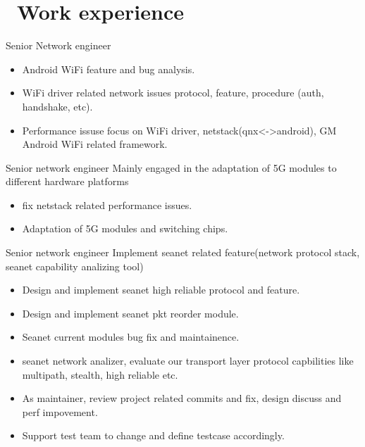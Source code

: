 \documentclass{resume}
\begin{document}



\section{\faUsers\ Work experience}
 {Senior Network engineer}
\begin{itemize}
\item Android WiFi feature and bug analysis.
\item WiFi driver related network issues protocol, feature, procedure (auth, handshake, etc).
\item Performance issuse focus on WiFi driver, netstack(qnx<->android), GM Android WiFi related framework.
\end{itemize}

 {Senior network engineer}
Mainly engaged in the adaptation of 5G modules to different hardware platforms
\begin{itemize}
\item fix netstack related performance issues.
\item Adaptation of 5G modules and switching chips.
\end{itemize}

 {Senior network engineer}
Implement seanet related feature(network protocol stack,  seanet capability analizing tool)
\begin{itemize}
\item Design and implement seanet high reliable protocol and feature.
\item Design and implement seanet pkt reorder module.
\item Seanet current modules bug fix and maintainence.
\item seanet network analizer, evaluate our transport layer protocol capbilities like multipath, stealth, high reliable etc.
\item As maintainer, review project related commits and fix, design discuss and perf impovement.
\item Support test team to change and define testcase accordingly.
\end{itemize}
\end{document}
